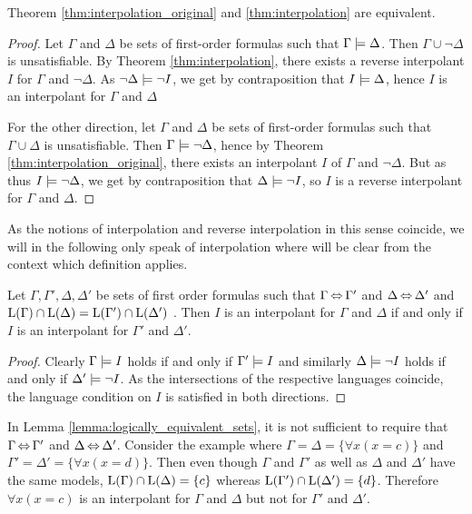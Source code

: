 \begin{prop}
	Theorem \ref{thm:interpolation_original} and \ref{thm:interpolation} are equivalent.
	\label{prop:interpolations_equivalent}
\end{prop}
\begin{proof}
	Let $\Gamma$ and $\Delta$ be sets of first-order formulas such that $ \Gamma \models \Delta$.
	Then $\Gamma \cup \lnot \Delta$ is unsatisfiable.
	By Theorem \ref{thm:interpolation}, there exists a reverse interpolant $I$ for $\Gamma$ and $\lnot \Delta$.
	As $\lnot \Delta \models \lnot I$, we get by contraposition that $I \models \Delta$, hence $I$ is an interpolant for $\Gamma$ and $\Delta$

	For the other direction,
	let $\Gamma$ and $\Delta$ be sets of first-order formulas such that $ \Gamma \cup \Delta$ is unsatisfiable.
	Then $\Gamma \models \lnot \Delta$, hence by Theorem \ref{thm:interpolation_original}, there exists an interpolant $I$ of $\Gamma$ and $\lnot \Delta$.
	But as thus $ I\models \lnot \Delta$, we get by contraposition that $\Delta \models \lnot I$, so $I$ is a reverse interpolant for $\Gamma$ and $\Delta$.
\end{proof}

As the notions of interpolation and reverse interpolation in this sense coincide, we will in the following only speak of interpolation where  will be clear from the context which definition applies.

\begin{lemma}
	\label{lemma:logically_equivalent_sets}
	Let $\Gamma, \Gamma', \Delta, \Delta'$ be sets of first order formulas such that $\Gamma \operatorname{\Leftrightarrow} \Gamma'$ and $\Delta \operatorname{\Leftrightarrow} \Delta'$ and $\operatorname{L}(\Gamma) \cap \operatorname{L}(\Delta) = \operatorname{L}(\Gamma') \cap \operatorname{L}(\Delta')$ .
	Then $I$ is an interpolant for $\Gamma$ and $\Delta$ if and only if $I$ is an interpolant for $\Gamma'$ and $\Delta'$.
\end{lemma}
\begin{proof}
	Clearly $\Gamma \models I$ holds if and only if $\Gamma' \models I$ and similarly
	$\Delta \models \lnot I$ holds if and only if $\Delta' \models \lnot I$.
	As the intersections of the respective languages coincide, the language condition on $I$ is satisfied in both directions.
\end{proof}

\begin{remark}
	In Lemma \ref{lemma:logically_equivalent_sets}, it is not sufficient to require that $\Gamma \operatorname{\Leftrightarrow} \Gamma'$ and $\Delta \operatorname{\Leftrightarrow} \Delta'$. 
	Consider the example where
	$\Gamma = \Delta = \{ \forall x (x=c)\}$
	and 
	$\Gamma' = \Delta' = \{ \forall x (x=d)\}$.
	Then even though $\Gamma$ and $\Gamma'$ as well as $\Delta$ and $\Delta'$ have the same models,
	$\operatorname{L}(\Gamma) \cap \operatorname{L}(\Delta) = \{c\}$
	whereas
	$\operatorname{L}(\Gamma') \cap \operatorname{L}(\Delta') = \{d\}$.
	Therefore $\forall x (x=c)$ is an interpolant for $\Gamma$ and $\Delta$ but not for $\Gamma'$ and $\Delta'$.
\end{remark}

